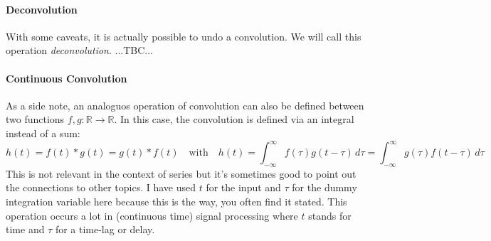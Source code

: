 



\paragraph{Deconvolution}
With some caveats, it is actually possible to undo a convolution. We will call this operation \emph{deconvolution}. ...TBC...

\paragraph{Continuous Convolution}
As a side note, an analoguos operation of convolution can also be defined between two functions $f,g: \mathbb{R} \rightarrow \mathbb{R}$. In this case, the convolution is defined via an integral instead of a sum:
\begin{equation}
 h(t) = f(t) \ast g(t) = g(t) \ast f(t) \quad \text{with} \quad
 h(t) = \int_{-\infty}^{\infty} f(\tau) g(t-\tau) \, d \tau 
      = \int_{-\infty}^{\infty} g(\tau) f(t-\tau) \, d \tau
\end{equation}
This is not relevant in the context of series but it's sometimes good to point out the connections to other topics. I have used $t$ for the input and $\tau$ for the dummy integration variable here because this is the way, you often find it stated. This operation occurs a lot in (continuous time) signal processing where $t$ stands for time and $\tau$ for a time-lag or delay.




